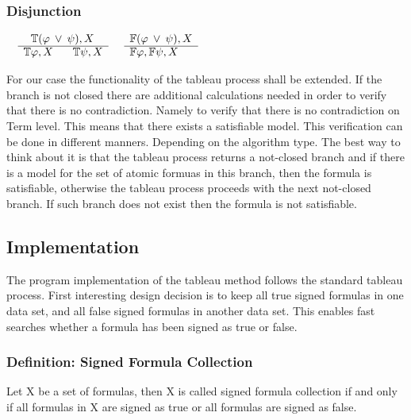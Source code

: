 \documentclass{article}
\begin{document}
		\subsubsection*{Disjunction}
			$\begin{array}{rl}
				& \:\:\: \mathbb{T}(\varphi \: \vee \: \psi), X \\
			      \cline{2-2}
			      & \mathbb{T}\varphi, X \:\:\:\:\:\:\:\: \mathbb{T}\psi, X
			\end{array}$
			\:\:\:\:\:\:\:\:\:\:\:\:\:\:\:\:\:\:\:\:\:\:\:\:\:\:\:\:\:\:\:\:
			$\begin{array}{rl}
				& \mathbb{F}(\varphi \: \vee \: \psi), X \\
			      \cline{2-2}
			      & \mathbb{F}\varphi, \mathbb{F}\psi, X
			\end{array}$

	\newpage
	For our case the functionality of the tableau process shall be extended. If the branch is not closed there are additional calculations needed in order to verify that there is no contradiction. Namely to verify that there is no contradiction on Term level. This means that there exists a satisfiable model.
	This verification can be done in different manners. Depending on the algorithm type. The best way to think about it is that the tableau process returns a not-closed branch and if there is a model for the set of atomic formuas in this branch, then the formula is satisfiable, otherwise the tableau process proceeds with the next not-closed branch. If such branch does not exist then the formula is not satisfiable.

	\subsection{Implementation}
	The program implementation of the tableau method follows the standard tableau process. First interesting design decision is to keep all true signed formulas in one data set, and all false signed formulas in another data set. This enables fast searches whether a formula has been signed as true or false.

	\subsubsection*{Definition: Signed Formula Collection}
	Let X be a set of formulas, then X is called signed formula collection if and only if all formulas in X are signed as true or all formulas are signed as false.
\end{document}
